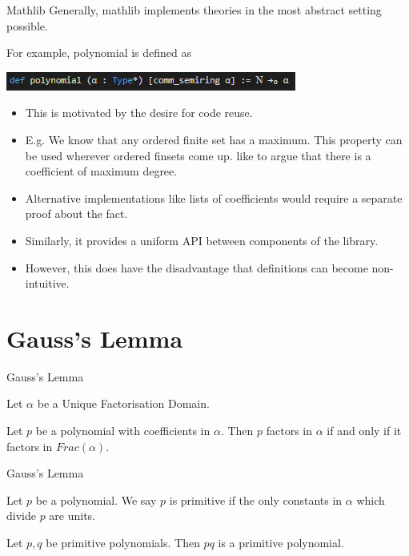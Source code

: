 \documentclass{beamer}
\begin{document}
\begin{frame}{Mathlib}
  Generally, mathlib implements theories in the most abstract setting possible. 

  For example, polynomial is defined as

  \includegraphics{polynomial.png}

  \begin{itemize}
    \item  This is motivated by the desire for code reuse. 
    \item E.g. We know that any ordered finite set has a maximum. This property can be used wherever ordered finsets come up. 
          like to argue that there is a coefficient of maximum degree. 
    \item Alternative implementations like lists of coefficients would require a separate proof about the fact. 
    \item Similarly, it provides a uniform API between components of the library. 
    \item However, this does have the disadvantage that definitions can become non-intuitive.
  \end{itemize}
\end{frame}

\section {Gauss's Lemma}

\begin{frame}{Gauss's Lemma}
  \begin{theorem}
    Let $\alpha$ be a Unique Factorisation Domain. 

    Let $p$ be a polynomial with coefficients in $\alpha$. Then $p$ factors in $\alpha$ if and only if it factors in $Frac(\alpha)$.
  \end{theorem}
\end{frame} 

\begin{frame}{Gauss's Lemma}
  \begin{definition}
    Let $p$ be a polynomial. We say $p$ is primitive if the only constants in $ \alpha $ which divide $p$ are units. 
  \end{definition}

  \begin{lemma}
    Let $p,q$ be primitive polynomials. Then $pq$ is a primitive polynomial.
  \end{lemma}

\end{frame}
\end{document}
